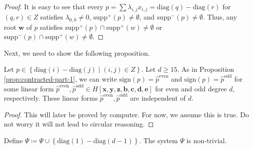 \begin{proof}
    It is easy to see that every \( p = \sum \lambda_{i,j} x_{i,j} = \mathrm{diag}(q) - \mathrm{diag}(r) \) for \( (q,r) \in Z \) satisfies \( \lambda_{0,0} \neq 0 \), \( \mathrm{supp}^+(p) \neq \emptyset \), and \( \mathrm{supp}^-(p) \neq \emptyset \). Thus, any root \( \mathbf{w} \) of \( p \) satisfies \( \mathrm{supp}^+(p) \cap \mathrm{supp}^+(w) \neq \emptyset \) or \( \mathrm{supp}^-(p) \cap \mathrm{supp}^+(w) \neq \emptyset \).
\end{proof}

Next, we need to show the following proposition.

\begin{proposition}
    Let \( p \in \left\{ \mathrm{diag}(i) - \mathrm{diag}(j) \mid (i,j) \in Z \right\} \). Let \( d \geq 15 \). As in Proposition \ref{prop:contracted-part-1}, we can write \( \mathrm{sign}(p) = \hat p^{\mathrm{even}} \) and  \( \mathrm{sign}(p) = \hat p^{\mathrm{odd}} \) for some linear form \( \hat p^{\mathrm{even}}, \hat p^{\mathrm{odd}} \in H[\mathbf{x}, \mathbf{y}, \mathbf{z}, \mathbf{b}, \mathbf{c}, \mathbf{d}, \mathbf{e}] \) for even and odd degree \( d \), respectively. These linear forms \(  \hat p^{\mathrm{even}}, \hat p^{\mathrm{odd}} \) are independent of \( d \).
\end{proposition}

\begin{proof}
    This will later be proved by computer. For now, we assume this is true. Do not worry it will not lead to circular reasoning.
\end{proof}

\begin{proposition}
    Define \( \Psi \coloneqq \Psi \cup \left\{ \mathrm{diag}(1) - \mathrm{diag}(d-1) \right\}\). The system \( \Psi \) is non-trivial.
\end{proposition}

